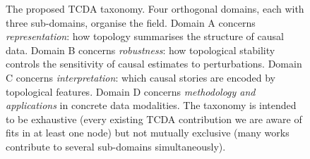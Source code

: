 \begin{figure}[t]
\caption{The proposed TCDA taxonomy. Four orthogonal domains, each with
three sub-domains, organise the field. Domain A concerns
\emph{representation}: how topology summarises the structure of causal
data. Domain B concerns \emph{robustness}: how topological stability
controls the sensitivity of causal estimates to perturbations. Domain C
concerns \emph{interpretation}: which causal stories are encoded by
topological features. Domain D concerns \emph{methodology and applications}
in concrete data modalities. The taxonomy is intended to be exhaustive
(every existing TCDA contribution we are aware of fits in at least one
node) but not mutually exclusive (many works contribute to several
sub-domains simultaneously).}
\label{fig:taxonomy}
\end{figure}
